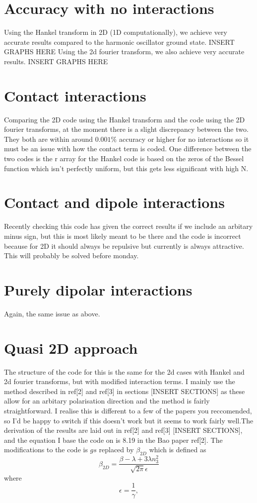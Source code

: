 \documentclass[12pt]{article}
\begin{document}
\section{Accuracy with no interactions}
Using the Hankel transform in 2D (1D computationally), we achieve very accurate results compared to the harmonic oscillator ground state.
INSERT GRAPHS HERE
Using the 2d fourier transform, we also achieve very accurate results.
INSERT GRAPHS HERE
\section{Contact interactions}
Comparing the 2D code using the Hankel transform and the code using the 2D fourier transforms, at the moment there is a slight discrepancy between the two. They both are within around $0.001\%$ accuracy or higher for no interactions so it must be an issue with how the contact term is coded. One difference between the two codes is the r array for the Hankel code is based on the zeros of the Bessel function which isn't perfectly uniform, but this gets less significant with high N.
\section{Contact and dipole interactions}
Recently checking this code has given the correct results if we include an arbitary minus sign, but this is most likely meant to be there and the code is incorrect because for 2D it should always be repulsive but currently is always attractive. This will probably be solved before monday.
\section{Purely dipolar interactions}
Again, the same issue as above.
\section{Quasi 2D approach}
The structure of the code for this is the same for the 2d cases with Hankel and 2d fourier transforms, but with modified interaction terms. I mainly use the method described in ref[2] and ref[3] in sections [INSERT SECTIONS] as these allow for an arbitary polarisation direction and the method is fairly straightforward. I realise this is different to a few of the papers you reccomended, so I'd be happy to switch if this doesn't work but it seems to work fairly well.The derivation of the results are laid out in ref[2] and ref[3] [INSERT SECTIONS], and the equation I base the code on is 8.19 in the Bao paper ref[2]. 
The modifications to the code is $gs$ replaced by $\beta_{2D}$ which is defined as 
\begin{equation}
\beta_{2D}=\frac{\beta -\lambda +3\lambda n_{3}^{2}}{\sqrt{2\pi}\epsilon}
\end{equation}
where 
\begin{equation}
\epsilon = \frac{1}{\gamma},
\end{equation}
\end{document}
